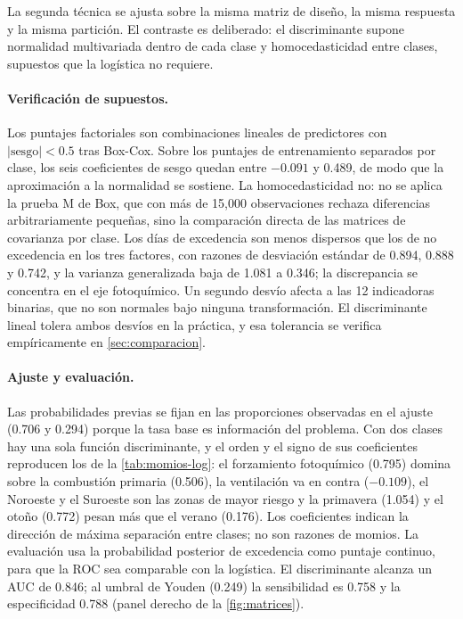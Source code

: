 La segunda técnica se ajusta sobre la misma matriz de diseño, la misma
respuesta y la misma partición. El contraste es deliberado: el discriminante
supone normalidad multivariada dentro de cada clase y homocedasticidad entre
clases, supuestos que la logística no requiere.

\paragraph{Verificación de supuestos.} Los puntajes factoriales son
combinaciones lineales de predictores con $|\text{sesgo}|<0.5$ tras Box-Cox.
Sobre los puntajes de entrenamiento separados por clase, los seis
coeficientes de sesgo quedan entre $-0.091$ y 0.489, de modo que la
aproximación a la normalidad se sostiene. La homocedasticidad no: no se
aplica la prueba M de Box, que con más de 15,000 observaciones rechaza
diferencias arbitrariamente pequeñas, sino la comparación directa de las
matrices de covarianza por clase. Los días de excedencia son menos dispersos
que los de no excedencia en los tres factores, con razones de desviación
estándar de 0.894, 0.888 y 0.742, y la varianza generalizada baja de 1.081 a
0.346; la discrepancia se concentra en el eje fotoquímico. Un segundo desvío
afecta a las 12 indicadoras binarias, que no son normales bajo ninguna
transformación. El discriminante lineal tolera ambos desvíos en la práctica,
y esa tolerancia se verifica empíricamente en \cref{sec:comparacion}.

\paragraph{Ajuste y evaluación.} Las probabilidades previas se fijan en las
proporciones observadas en el ajuste (0.706 y 0.294) porque la tasa base es
información del problema. Con dos clases hay una sola función
discriminante, y el orden y el signo de sus coeficientes reproducen los de
la \cref{tab:momios-log}: el forzamiento fotoquímico
(0.795) domina sobre la combustión primaria (0.506), la ventilación va en
contra ($-0.109$), el Noroeste y el Suroeste son las zonas de mayor riesgo y
la primavera (1.054) y el otoño (0.772) pesan más que el verano (0.176).
Los coeficientes indican la dirección de máxima separación entre clases; no
son razones de momios. La evaluación usa la
probabilidad posterior de excedencia como puntaje continuo, para que la ROC
sea comparable con la logística. El discriminante alcanza un AUC de 0.846;
al umbral de Youden (0.249) la sensibilidad es 0.758 y la especificidad
0.788 (panel derecho de la \cref{fig:matrices}).

